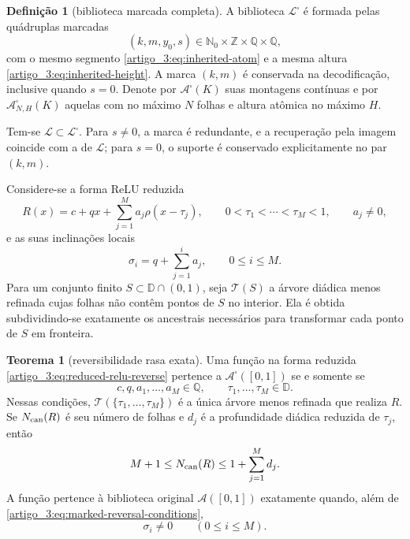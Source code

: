 \documentclass[12pt,a4paper]{article}
\theoremstyle{preciso}
\theoremstyle{definition}
\newcommand{\Nzero}{\mathbb{N}_0}
\newcommand{\Aclass}{\mathcal{A}}
\newcommand{\Library}{\mathcal{L}}
\theoremstyle{preciso}
\newtheorem{theorem}[teorema]{Teorema}
\theoremstyle{preciso}
\theoremstyle{preciso}
\theoremstyle{preciso}
\theoremstyle{definition}
\newtheorem{definition}[teorema]{Definição}
\theoremstyle{preciso}
\theoremstyle{definition}
\theoremstyle{preciso}
\theoremstyle{preciso}
\theoremstyle{definition}
\begin{document}
\begin{definition}[biblioteca marcada completa]\label{map:artigo_3:5.1}
\label{artigo_3:def:marked-completion}
A biblioteca $\Library^\square$ é formada pelas quádruplas marcadas
\begin{equation}
 (k,m,y_0,s)\in\Nzero\times\mathbb Z\times\mathbb Q\times\mathbb Q,
 \label{artigo_3:eq:marked-atoms}
\end{equation}
com o mesmo segmento \eqref{artigo_3:eq:inherited-atom} e a mesma altura
\eqref{artigo_3:eq:inherited-height}. A marca $(k,m)$ é conservada na decodificação,
inclusive quando $s=0$. Denote por $\Aclass^\square(K)$ suas montagens
contínuas e por $\Aclass^\square_{N,H}(K)$ aquelas com no máximo $N$
folhas e altura atômica no máximo $H$.
\end{definition}

Tem-se $\Library\subset\Library^\square$. Para $s\ne0$, a marca é redundante,
e a recuperação pela imagem coincide com a de $\Library$; para $s=0$, o
suporte é conservado explicitamente no par $(k,m)$.

Considere-se a forma ReLU reduzida
\begin{equation}
 R(x)=c+qx+\sum_{j=1}^{M}a_j\rho(x-\tau_j),
 \qquad 0<\tau_1<\cdots<\tau_M<1,
 \qquad a_j\ne0,
 \label{artigo_3:eq:reduced-relu-reverse}
\end{equation}
e as suas inclinações locais
\begin{equation}
 \sigma_i=q+\sum_{j=1}^{i}a_j,
 \qquad 0\le i\le M.
 \label{artigo_3:eq:reverse-local-slopes}
\end{equation}
Para um conjunto finito $S\subset\mathbb D\cap(0,1)$, seja
$\mathcal T(S)$ a árvore diádica menos refinada cujas folhas não contêm
pontos de $S$ no interior. Ela é obtida subdividindo-se exatamente os ancestrais
necessários para transformar cada ponto de $S$ em fronteira.

\begin{theorem}[reversibilidade rasa exata]\label{map:artigo_3:5.2}
\label{artigo_3:thm:exact-marked-reversal}
Uma função na forma reduzida \eqref{artigo_3:eq:reduced-relu-reverse} pertence a
$\Aclass^\square([0,1])$ se e somente se
\begin{equation}
 c,q,a_1,\ldots,a_M\in\mathbb Q,
 \qquad
 \tau_1,\ldots,\tau_M\in\mathbb D.
 \label{artigo_3:eq:marked-reversal-conditions}
\end{equation}
Nessas condições, $\mathcal T(\{\tau_1,\ldots,\tau_M\})$ é a única árvore
menos refinada que realiza $R$. Se $N_{\rm can}(R)$ é seu número de folhas e
$d_j$ é a profundidade diádica reduzida de $\tau_j$, então
\begin{equation}
 M+1\le N_{\rm can}(R)
 \le 1+\sum_{j=1}^{M}d_j.
 \label{artigo_3:eq:canonical-tree-leaf-bounds}
\end{equation}
A função pertence à biblioteca original $\Aclass([0,1])$ exatamente quando,
além de \eqref{artigo_3:eq:marked-reversal-conditions},
\begin{equation}
 \sigma_i\ne0\qquad(0\le i\le M).
 \label{artigo_3:eq:original-nonflat-condition}
\end{equation}
\end{theorem}
\end{document}

